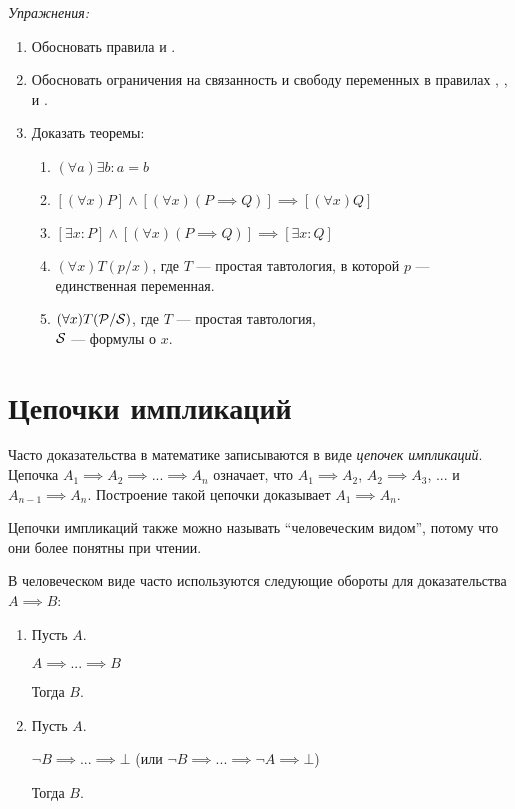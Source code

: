 \vspace{1em}
{\it Упражнения:}
\begin{enumerate}
	\item{}Обосновать правила \Eii{} и \Eee{}.
	\item{}Обосновать ограничения на связанность и свободу переменных в правилах
	\Aii{}, \Aee{}, \Eii{} и \Eee{}.
	\pagebreak
	\item{}\label{ex:obv_thm}Доказать теоремы:
	\begin{fullwidth}
		\begin{multicols}{2}
			\begin{enumerate}
				\item{}$(\forall a)\exists b:a=b$
				\item{}$[(\forall x)P]\land[(\forall x)(P\implies Q)]
					\implies [(\forall x)Q]$\label{thm:obv_forall}
				\item{}$[\exists x:P]\land[(\forall x)(P\implies Q)]
					\implies [\exists x:Q]$
				\item{}$(\forall x)T(p/x)$, где $T$ --- простая тавтология,
				в которой $p$ --- единственная переменная.
				\item{}$(\forall x)T(\mathcal P/\mathcal S)$, где $T$ --- простая тавтология,\\
				$\mathcal S$ --- формулы о $x$.\label{thm:obv_taut}
			\end{enumerate}
		\end{multicols}
	\end{fullwidth}
\end{enumerate}

\section{Цепочки импликаций}

Часто доказательства в математике записываются в виде {\it цепочек импликаций}.
Цепочка $A_1\implies A_2\implies...\implies A_{n}$ означает, что $A_1\implies A_2$,
$A_2\implies A_3$, ... и $A_{n-1}\implies A_{n}$.
Построение такой цепочки доказывает $A_1\implies A_{n}$.

Цепочки импликаций также можно называть ``человеческим видом'', потому что они более
понятны при чтении.

В человеческом виде часто используются следующие обороты
для доказательства $A\implies B$:
\begin{enumerate}
	\item{}
	Пусть $A$.

	$A\implies ...\implies B$

	Тогда $B$.
	\item{}
	Пусть $A$.

	$\lnot B\implies ...\implies \bot$
	(или $\lnot B\implies ...\implies \lnot A\implies\bot$)

	Тогда $B$.
\end{enumerate}

